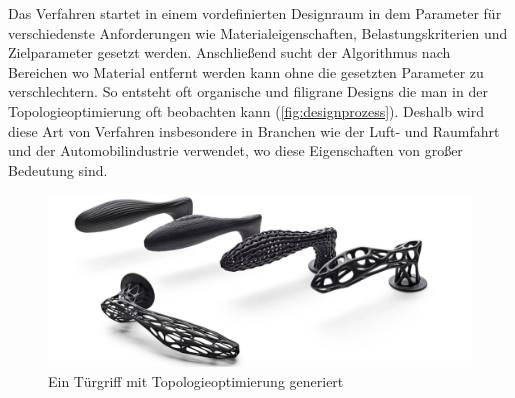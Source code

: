 Das Verfahren startet in einem vordefinierten Designraum in dem Parameter für verschiedenste Anforderungen wie Materialeigenschaften, Belastungskriterien und Zielparameter gesetzt werden. Anschließend sucht der Algorithmus nach Bereichen wo Material entfernt werden kann ohne die gesetzten Parameter zu verschlechtern. So entsteht oft organische und filigrane Designs die man in der Topologieoptimierung oft beobachten kann (\autoref{fig:designprozess}). Deshalb wird diese Art von Verfahren insbesondere in Branchen wie der Luft- und Raumfahrt und der Automobilindustrie verwendet, wo diese Eigenschaften von großer Bedeutung sind. \autocite{17}

\begin{figure}[h]
    \centering
    \begin{minipage}{0.5\textwidth}
      \centering
      \includegraphics[width=\textwidth]{./images/organicDesign.jpeg}
    \end{minipage}
    \caption{Ein Türgriff mit Topologieoptimierung generiert}
    \label{fig:designprozess}
  \end{figure}